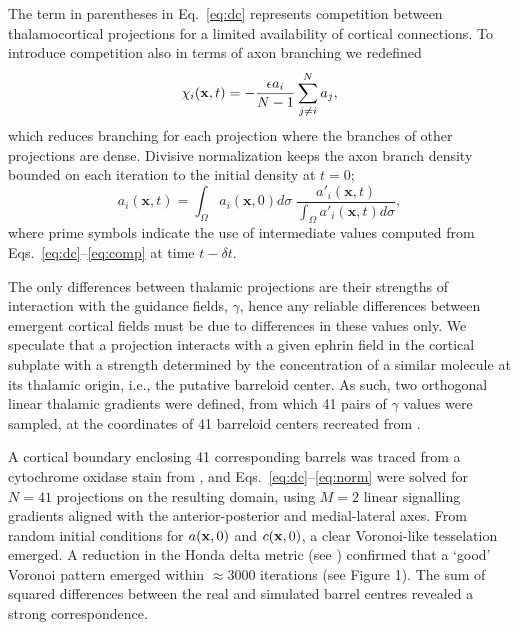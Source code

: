 \documentclass[9pt,twocolumn,twoside,lineno]{pnas-new}
\begin{document}
The term in parentheses in Eq.~\ref{eq:dc} represents competition between thalamocortical projections for a limited availability of cortical connections. To introduce competition also in terms of axon branching we redefined
%
\begin{equation} \label{eq:comp}
\chi_i(\mathbf{x}, t) = - \frac{\epsilon  a_i}{N-1} \sum_{j \ne i}^{N} a_{j},
\end{equation}
%
which reduces branching for each projection where the branches of other projections are dense. Divisive normalization keeps the axon branch density bounded on each iteration to the initial density  at $t=0$;
%
\begin{equation} \label{eq:norm}
  a_i(\mathbf{x}, t) = \int_\Omega  a_i(\mathbf{x}, 0) d\sigma \; \frac {a'_i(\mathbf{x}, t)} {\int_\Omega
  a'_i(\mathbf{x}, t) d\sigma},
\end{equation}
%
where prime symbols indicate the use of intermediate values computed from Eqs.~\ref{eq:dc}--\ref{eq:comp} at time $t-{\delta}t$.

The only differences between thalamic projections are their strengths of interaction with the guidance fields, $\gamma$, hence any reliable differences between emergent cortical fields must be due to differences in these values only. We speculate that a projection interacts with a given ephrin field in the cortical subplate with a strength determined by the concentration of a similar molecule at its thalamic origin, i.e., the putative barreloid center. As such, two orthogonal linear thalamic gradients were defined, from which 41 pairs of $\gamma$ values were sampled, at the coordinates of 41 barreloid centers recreated from \cite{haidarliu_size_2001}.

A cortical boundary enclosing 41 corresponding barrels was traced from a cytochrome oxidase stain from \cite{zheng_signal_2001}, and Eqs.~\ref{eq:dc}--\ref{eq:norm} were solved for $N=41$ projections on the resulting domain, using $M=2$ linear signalling gradients aligned with the anterior-posterior and  medial-lateral axes. From random initial conditions for $a({\bf x},0)$ and $c({\bf x},0)$, a clear Voronoi-like tesselation emerged. A reduction in the Honda delta metric (see \cite{senft_mouse_1991}) confirmed that a `good' Voronoi pattern emerged within $\approx 3000$ iterations (see Figure 1). The sum of squared differences between the real and simulated barrel centres revealed a strong correspondence.
\end{document}
